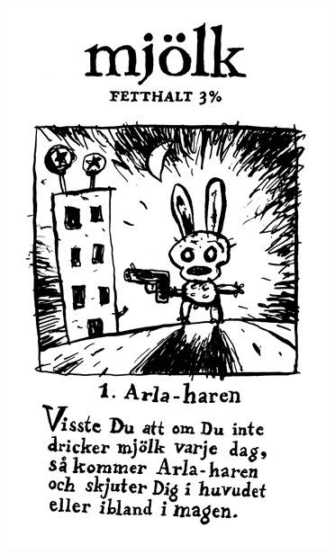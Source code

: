 \documentclass{article}
\begin{document}

\includegraphics[width=0.9\linewidth]{images/memes/arla.jpg}
\end{document}
